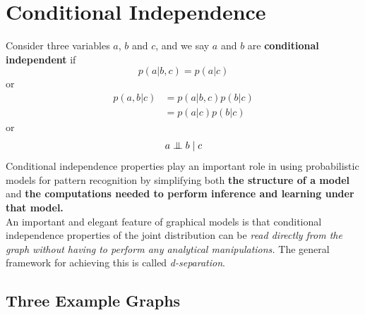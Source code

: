 \documentclass[a3paper, 12pt]{book} %
\newcommand{\CI}{\mathrel{\perp\mspace{-10mu}\perp}}
\begin{document}
\section{Conditional Independence}
Consider three variables $a$, $b$ and $c$, and we say $a$ and $b$ are \textbf{conditional independent} if 
\begin{equation}
p(a|b,c)=p(a|c)
\end{equation}
or 
\begin{equation}
\begin{split}
p(a,b|c) &=p(a|b,c)p(b|c) \\
&=p(a|c)p(b|c)
\end{split}
\end{equation}
or 
\begin{equation}
a \CI b \mid c
\end{equation}
Conditional independence properties play an important role in using probabilistic models for pattern recognition by simplifying both \textbf{the structure of a model} and \textbf{the computations needed to perform inference and learning under that model.}  \\

An important and elegant feature of graphical models is that conditional independence properties of the joint distribution can be \emph{read directly from the graph without having to perform any analytical manipulations.} The general framework for achieving this is called \emph{d-separation}.

\subsection{Three Example Graphs}
\end{document}
